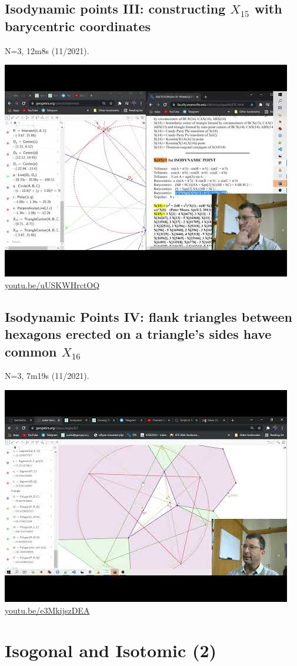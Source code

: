 \documentclass[12pt]{amsart}
\begin{document}
\subsection{Isodynamic points III: constructing $X_{15}$ with barycentric coordinates}
\label{vid:uUSKWHrctOQ}
\noindent N=3, 12m8s (11/2021). 
\begin{center}\includegraphics[width=.5\textwidth]{pics/uUSKWHrctOQ.jpg} \\ 
\href{https://youtu.be/uUSKWHrctOQ}{\url{youtu.be/uUSKWHrctOQ}}\end{center}
% 

\subsection{Isodynamic Points IV: flank triangles between hexagons erected on a triangle's sides have common $X_{16}$}
\label{vid:e3MkijszDEA}
\noindent N=3, 7m19s (11/2021). 
\begin{center}\includegraphics[width=.5\textwidth]{pics/e3MkijszDEA.jpg} \\ 
\href{https://youtu.be/e3MkijszDEA}{\url{youtu.be/e3MkijszDEA}}\end{center}
% 


\section{Isogonal and Isotomic (2)}
\end{document}
